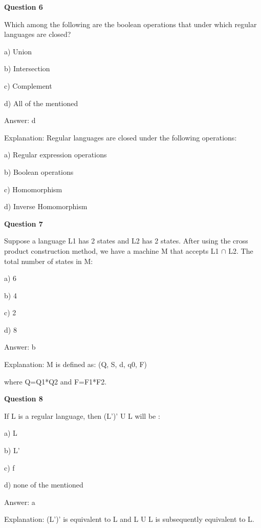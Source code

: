 \documentclass{article}
\begin{document}
\begin{mdframed}[linewidth=1pt, roundcorner=5pt, linecolor=gray!30, backgroundcolor=gray!5]
\textbf{Question 6} 

Which among the following are the boolean operations that under which regular languages are closed?

a) Union

b) Intersection

c) Complement

d) All of the mentioned
\vspace{5pt} \par
\begin{tcolorbox}[colback=green!5, colframe=green!40!black, title=Solution]
Answer: d

Explanation: Regular languages are closed under the following operations:

a) Regular expression operations

b) Boolean operations

c) Homomorphism

d) Inverse Homomorphism
\end{tcolorbox}
\end{mdframed}
\newpage

\begin{mdframed}[linewidth=1pt, roundcorner=5pt, linecolor=gray!30, backgroundcolor=gray!5]
\textbf{Question 7} 

Suppose a language L1 has 2 states and L2 has 2 states. After using the cross product construction method,	we have a machine M that accepts L1 $\cap$ L2. The total number of states in M:

a) 6

b) 4

c) 2

d) 8
\vspace{5pt} \par
\begin{tcolorbox}[colback=green!5, colframe=green!40!black, title=Solution]
Answer: b

Explanation: M is defined as: (Q, S, d, q0, F)

where Q=Q1*Q2 and F=F1*F2.
\end{tcolorbox}
\end{mdframed}

\begin{mdframed}[linewidth=1pt, roundcorner=5pt, linecolor=gray!30, backgroundcolor=gray!5]
\textbf{Question 8} 

If L is a regular language, then (L')' U L will be :

a) L

b) L'

c) f

d) none of the mentioned
\vspace{5pt} \par
\begin{tcolorbox}[colback=green!5, colframe=green!40!black, title=Solution]
Answer: a

Explanation: (L')' is equivalent to L and L U L is subsequently equivalent to L.
\end{tcolorbox}
\end{mdframed}
\end{document}
